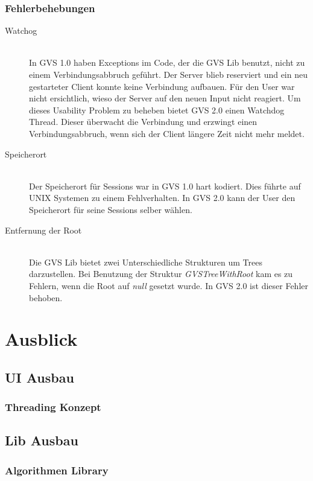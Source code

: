 \documentclass[11pt,a4paper,english,oneside]{book}
\numberwithin{equation}{chapter}
\begin{document}
	\subsection{Fehlerbehebungen}
	\begin{description}
		\item[Watchog] \hfill \\ In GVS 1.0 haben Exceptions im Code, der die GVS Lib benutzt, nicht zu einem Verbindungsabbruch geführt. Der Server blieb reserviert und ein neu gestarteter Client konnte keine Verbindung aufbauen. Für den User war nicht ersichtlich, wieso der Server auf den neuen Input nicht reagiert. Um dieses Usability Problem zu beheben bietet GVS 2.0 einen Watchdog Thread. Dieser überwacht die Verbindung und erzwingt einen Verbindungsabbruch, wenn sich der Client längere Zeit nicht mehr meldet.
		\item[Speicherort]  \hfill \\ Der Speicherort für Sessions war in GVS 1.0 hart kodiert. Dies führte auf UNIX Systemen zu einem Fehlverhalten. In GVS 2.0 kann der User den Speicherort für seine Sessions selber wählen.
		\item[Entfernung der Root] \hfill \\ Die GVS Lib bietet zwei Unterschiedliche Strukturen um Trees darzustellen. Bei Benutzung der Struktur \textit{GVSTreeWithRoot} kam es zu Fehlern, wenn die Root auf \textit{null} gesetzt wurde. In GVS 2.0 ist dieser Fehler behoben.
	\end{description}


	\chapter{Ausblick} \label{ch:ausblick}
	
	\section{UI Ausbau}
	
	\subsection{Threading Konzept}
	
	\section{Lib Ausbau}
	
	\subsection{Algorithmen Library}
	
\end{document}
